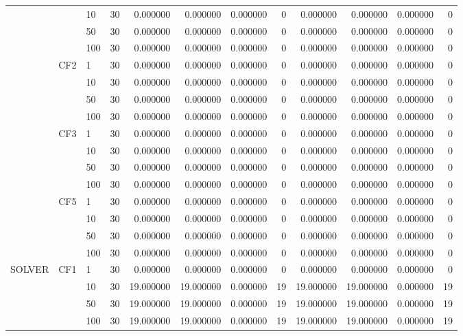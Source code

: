 \begin{tabular}{lllrrrrrrrrr}
 &  & 10 & 30 & 0.000000 & 0.000000 & 0.000000 & 0 & 0.000000 & 0.000000 & 0.000000 & 0 \\
 &  & 50 & 30 & 0.000000 & 0.000000 & 0.000000 & 0 & 0.000000 & 0.000000 & 0.000000 & 0 \\
 &  & 100 & 30 & 0.000000 & 0.000000 & 0.000000 & 0 & 0.000000 & 0.000000 & 0.000000 & 0 \\
\cline{2-12}
 & \multirow[t]{4}{*}{CF2} & 1 & 30 & 0.000000 & 0.000000 & 0.000000 & 0 & 0.000000 & 0.000000 & 0.000000 & 0 \\
 &  & 10 & 30 & 0.000000 & 0.000000 & 0.000000 & 0 & 0.000000 & 0.000000 & 0.000000 & 0 \\
 &  & 50 & 30 & 0.000000 & 0.000000 & 0.000000 & 0 & 0.000000 & 0.000000 & 0.000000 & 0 \\
 &  & 100 & 30 & 0.000000 & 0.000000 & 0.000000 & 0 & 0.000000 & 0.000000 & 0.000000 & 0 \\
\cline{2-12}
 & \multirow[t]{4}{*}{CF3} & 1 & 30 & 0.000000 & 0.000000 & 0.000000 & 0 & 0.000000 & 0.000000 & 0.000000 & 0 \\
 &  & 10 & 30 & 0.000000 & 0.000000 & 0.000000 & 0 & 0.000000 & 0.000000 & 0.000000 & 0 \\
 &  & 50 & 30 & 0.000000 & 0.000000 & 0.000000 & 0 & 0.000000 & 0.000000 & 0.000000 & 0 \\
 &  & 100 & 30 & 0.000000 & 0.000000 & 0.000000 & 0 & 0.000000 & 0.000000 & 0.000000 & 0 \\
\cline{2-12}
 & \multirow[t]{4}{*}{CF5} & 1 & 30 & 0.000000 & 0.000000 & 0.000000 & 0 & 0.000000 & 0.000000 & 0.000000 & 0 \\
 &  & 10 & 30 & 0.000000 & 0.000000 & 0.000000 & 0 & 0.000000 & 0.000000 & 0.000000 & 0 \\
 &  & 50 & 30 & 0.000000 & 0.000000 & 0.000000 & 0 & 0.000000 & 0.000000 & 0.000000 & 0 \\
 &  & 100 & 30 & 0.000000 & 0.000000 & 0.000000 & 0 & 0.000000 & 0.000000 & 0.000000 & 0 \\
\cline{1-12} \cline{2-12}
\multirow[t]{16}{*}{SOLVER} & \multirow[t]{4}{*}{CF1} & 1 & 30 & 0.000000 & 0.000000 & 0.000000 & 0 & 0.000000 & 0.000000 & 0.000000 & 0 \\
 &  & 10 & 30 & 19.000000 & 19.000000 & 0.000000 & 19 & 19.000000 & 19.000000 & 0.000000 & 19 \\
 &  & 50 & 30 & 19.000000 & 19.000000 & 0.000000 & 19 & 19.000000 & 19.000000 & 0.000000 & 19 \\
 &  & 100 & 30 & 19.000000 & 19.000000 & 0.000000 & 19 & 19.000000 & 19.000000 & 0.000000 & 19 \\

\end{tabular}
